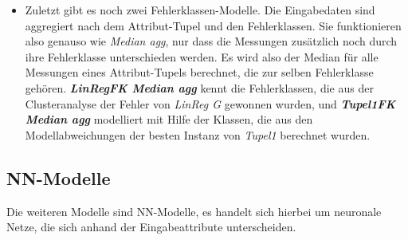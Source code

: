 \documentclass[
	12pt,
	a4paper,
	BCOR10mm,
	DIV14,
	listof=totoc,
	bibliography=totoc,
	headsepline
]{scrreprt}
\begin{document}
\begin{itemize}
	\item Zuletzt gibt es noch zwei Fehlerklassen-Modelle. Die Eingabedaten sind aggregiert nach dem Attribut-Tupel und den Fehlerklassen. 
Sie funktionieren also genauso wie \textit{Median agg}, nur dass die Messungen zusätzlich noch durch ihre Fehlerklasse unterschieden werden. Es wird also der Median für alle Messungen eines Attribut-Tupels berechnet, die zur selben Fehlerklasse gehören.
\textit{\textbf{LinRegFK Median agg}} kennt die Fehlerklassen, die aus der Clusteranalyse der Fehler von \textit{LinReg G} gewonnen wurden, und \textit{\textbf{Tupel1FK Median agg}} modelliert mit Hilfe der Klassen, die aus den Modellabweichungen der besten Instanz von \textit{Tupel1} berechnet wurden.
\end{itemize}

\begin{table}
	\centering
	\scriptsize
	\label{tab:zusammenfasssung_referenz}
	\caption{Kurzbeschreibungen der der Referenzmodelle}
\end{table}

\subsection{NN-Modelle}
Die weiteren Modelle sind NN-Modelle, es handelt sich hierbei um neuronale Netze, die sich anhand der Eingabeattribute unterscheiden.
\end{document}
